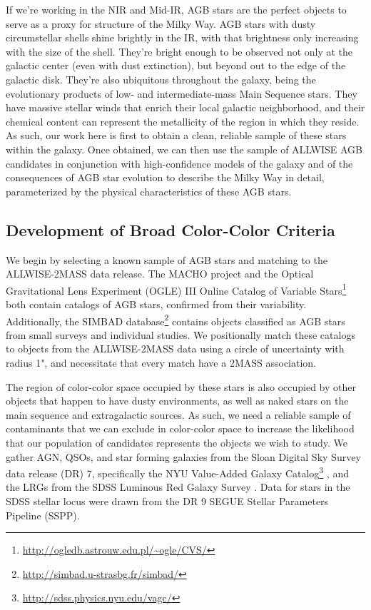 If we're working in the NIR and Mid-IR, AGB stars are the perfect objects to serve as a proxy for structure of the Milky Way. AGB stars with dusty circumstellar shells shine brightly in the IR, with that brightness only increasing with the size of the shell. They're bright enough to be observed not only at the galactic center (even with dust extinction), but beyond out to the edge of the galactic disk. They're also ubiquitous throughout the galaxy, being the evolutionary products of low- and intermediate-mass Main Sequence stars. They have massive stellar winds that enrich their local galactic neighborhood, and their chemical content can represent the metallicity of the region in which they reside. As such, our work here is first to obtain a clean, reliable sample of these stars within the galaxy. Once obtained, we can then use the sample of ALLWISE AGB candidates in conjunction with high-confidence models of the galaxy and of the consequences of AGB star evolution to describe the Milky Way in detail, parameterized by the physical characteristics of these AGB stars.

\subsection{Development of Broad Color-Color Criteria}
We begin by selecting a known sample of AGB stars and matching to the ALLWISE-2MASS data release. The MACHO project \citep{2008AJ....136.1242F} and the Optical Gravitational Lens Experiment (OGLE) III Online Catalog of Variable Stars\footnote{\url{http://ogledb.astrouw.edu.pl/~ogle/CVS/}} both contain catalogs of AGB stars, confirmed from their variability. Additionally, the SIMBAD database\footnote{\url{http://simbad.u-strasbg.fr/simbad/}} contains objects classified as AGB stars from small surveys and individual studies. We positionally match these catalogs to objects from the ALLWISE-2MASS data using a circle of uncertainty with radius 1", and necessitate that every match have a 2MASS association.

The region of color-color space occupied by these stars is also occupied by other objects that happen to have dusty environments, as well as naked stars on the main sequence and extragalactic sources. As such, we need a reliable sample of contaminants that we can exclude in color-color space to increase the likelihood that our population of candidates represents the objects we wish to study. We gather AGN, QSOs, and star forming galaxies from the Sloan Digital Sky Survey \citep{2000AJ....120.1579Y} data release (DR) 7, specifically the NYU Value-Added Galaxy Catalog\footnote{\url{http://sdss.physics.nyu.edu/vagc/}} \citep[VAGC]{2005AJ....129.2562B}, and the LRGs from the SDSS Luminous Red Galaxy Survey \citep{2010ApJ...710.1444K}. Data for stars in the SDSS stellar locus \citep{2014MNRAS.440.3430D} were drawn from the DR 9 SEGUE Stellar Parameters Pipeline (SSPP).


